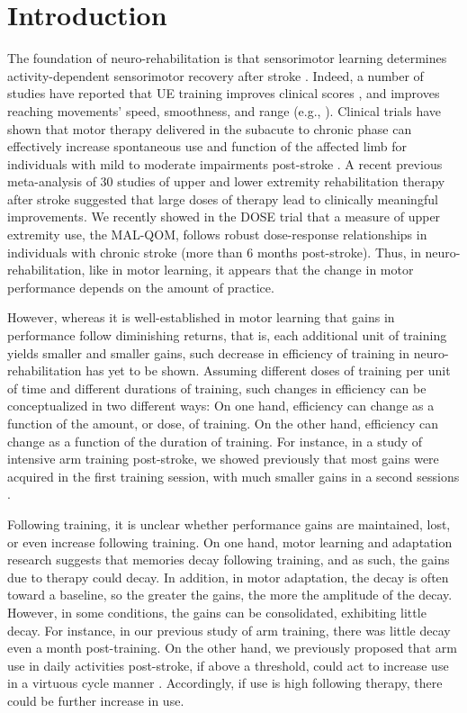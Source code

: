 \section{Introduction}
The foundation of neuro-rehabilitation is that sensorimotor learning determines activity-dependent sensorimotor recovery after stroke \cite{Kitago2013, Krakauer2006}. 
Indeed, a number of studies have reported that UE training improves clinical scores \cite{Cirstea2003}, \cite{Kamper2002, Kwakkel2006, McCrea2005} and improves reaching movements’ speed, smoothness, and range (e.g., \cite{Anton1996}). 
Clinical trials have shown that motor therapy delivered in the subacute to chronic phase can effectively increase spontaneous use and function of the affected limb for individuals with mild to moderate impairments post-stroke \cite{Wolf2006, Lohse2014}. 
A recent previous meta-analysis of 30 studies of upper and lower extremity rehabilitation therapy after stroke suggested that large doses of therapy lead to clinically meaningful improvements. 
We recently showed in the DOSE trial that a measure of upper extremity use, the MAL-QOM, follows robust dose-response relationships in individuals with chronic stroke (more than 6 months post-stroke). 
Thus, in neuro-rehabilitation, like in motor learning, it appears that the change in motor performance depends on the amount of practice. 

However, whereas it is well-established in motor learning that gains in performance follow diminishing returns, that is, each additional unit of training yields smaller and smaller gains, such decrease in efficiency of training in neuro-rehabilitation has yet to be shown. 
Assuming different doses of training per unit of time and different durations of training, such changes in efficiency can be conceptualized in two different ways: On one hand, efficiency can change as a function of the amount, or dose, of training. 
On the other hand, efficiency can change as a function of the duration of training. 
For instance, in a study of intensive arm training post-stroke, we showed previously that most gains were acquired in the first training session, with much smaller gains in a second sessions \cite{Park2016}.

Following training, it is unclear whether performance gains are maintained, lost, or even increase following training.
On one hand, motor learning and adaptation research suggests that memories decay following training, and as such, the gains due to therapy could decay. 
In addition, in motor adaptation, the decay is often toward a baseline, so the greater the gains, the more the amplitude of the decay. 
However, in some conditions, the gains can be consolidated, exhibiting little decay. 
For instance, in our previous study of arm training, there was little decay even a month post-training. 
On the other hand, we previously proposed that arm use in daily activities post-stroke, if above a threshold, could act to increase use in a virtuous cycle manner \cite{Hidaka2012, Schweighofer2009}. 
Accordingly, if use is high following therapy, there could be further increase in use. 

